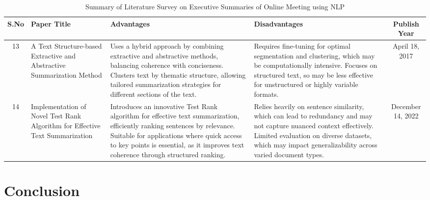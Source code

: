 \documentclass{article}
\begin{document}
\newpage
\clearpage

\begin{table}[htp]
\centering
\renewcommand{\arraystretch}{1.5}
\begin{tabular}{|c|p{4cm}|p{4cm}|p{4cm}|c|}
\hline
\textbf{S.No} & \textbf{Paper Title} & \textbf{Advantages} & \textbf{Disadvantages} & \textbf{Publish Year} \\ \hline

13 & A Text Structure-based Extractive and Abstractive Summarization Method & Uses a hybrid approach by combining extractive and abstractive methods, balancing coherence with conciseness. Clusters text by thematic structure, allowing tailored summarization strategies for different sections of the text. & Requires fine-tuning for optimal segmentation and clustering, which may be computationally intensive. Focuses on structured text, so may be less effective for unstructured or highly variable formats. & April 18, 2017 \\ \hline

14 & Implementation of Novel Test Rank Algorithm for Effective Text Summarization & Introduces an innovative Test Rank algorithm for effective text summarization, efficiently ranking sentences by relevance. Suitable for applications where quick access to key points is essential, as it improves text coherence through structured ranking. & Relies heavily on sentence similarity, which can lead to redundancy and may not capture nuanced context effectively. Limited evaluation on diverse datasets, which may impact generalizability across varied document types. & December 14, 2022 \\ \hline


\end{tabular}
\caption{Summary of Literature Survey on Executive Summaries of Online Meeting using NLP }
\label{table:literature_survey}
\end{table}

\clearpage

\section{Conclusion}
\end{document}
